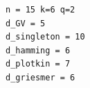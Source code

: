 \begin{verbatim}
n = 15 k=6 q=2
d_GV = 5
d_singleton = 10
d_hamming = 6
d_plotkin = 7
d_griesmer = 6
\end{verbatim}
